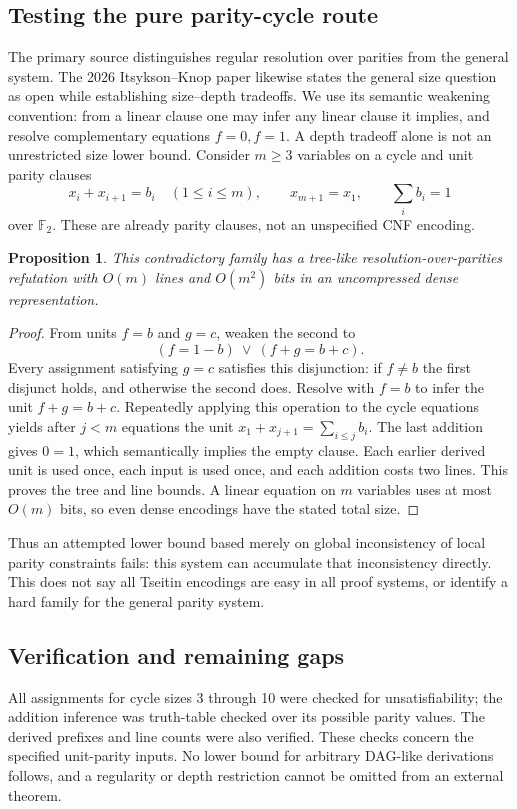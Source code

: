 \documentclass[11pt]{article}
\newtheorem{proposition}{Proposition}
\begin{document}
\subsection{Testing the pure parity-cycle route}
The primary source distinguishes regular resolution over parities from the general system. The 2026 Itsykson--Knop paper likewise states the general size question as open while establishing size--depth tradeoffs. We use its semantic weakening convention: from a linear clause one may infer any linear clause it implies, and resolve complementary equations $f=0,f=1$. A depth tradeoff alone is not an unrestricted size lower bound.
Consider $m\ge3$ variables on a cycle and unit parity clauses
\[
x_i+x_{i+1}=b_i\quad(1\le i\le m),\qquad x_{m+1}=x_1,
\qquad \sum_i b_i=1
\]
over $\mathbb F_2$. These are already parity clauses, not an unspecified CNF encoding.
\begin{proposition}
This contradictory family has a tree-like resolution-over-parities refutation with $O(m)$ lines and $O(m^2)$ bits in an uncompressed dense representation.
\end{proposition}
\begin{proof}
From units $f=b$ and $g=c$, weaken the second to
\[
(f=1-b)\ \vee\ (f+g=b+c).
\]
Every assignment satisfying $g=c$ satisfies this disjunction: if $f\ne b$ the first disjunct holds, and otherwise the second does. Resolve with $f=b$ to infer the unit $f+g=b+c$. Repeatedly applying this operation to the cycle equations yields after $j<m$ equations the unit $x_1+x_{j+1}=\sum_{i\le j}b_i$. The last addition gives $0=1$, which semantically implies the empty clause. Each earlier derived unit is used once, each input is used once, and each addition costs two lines. This proves the tree and line bounds. A linear equation on $m$ variables uses at most $O(m)$ bits, so even dense encodings have the stated total size.
\end{proof}
Thus an attempted lower bound based merely on global inconsistency of local parity constraints fails: this system can accumulate that inconsistency directly. This does not say all Tseitin encodings are easy in all proof systems, or identify a hard family for the general parity system.
\subsection{Verification and remaining gaps}
All assignments for cycle sizes 3 through 10 were checked for unsatisfiability; the addition inference was truth-table checked over its possible parity values. The derived prefixes and line counts were also verified. These checks concern the specified unit-parity inputs. No lower bound for arbitrary DAG-like derivations follows, and a regularity or depth restriction cannot be omitted from an external theorem.
\end{document}
